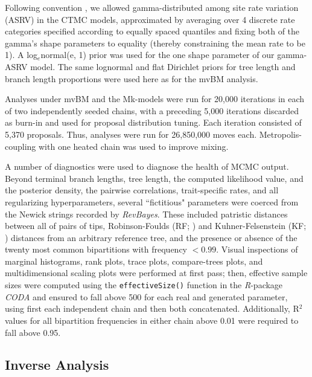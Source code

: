 \documentclass[10pt, twocolumn, twoside]{article}
\begin{document}
Following convention \citep{yangAmongsiteRateVariation1996}, we allowed gamma-distributed among site rate variation (ASRV) in the CTMC models, approximated by averaging over 4 discrete rate categories specified according to equally spaced quantiles and fixing both of the gamma's shape parameters to equality (thereby constraining the mean rate to be 1). A log$_{e}$normal(e, 1) prior was used for the one shape parameter of our gamma-ASRV model. The same lognormal and flat Dirichlet priors for tree length and branch length proportions were used here as for the mvBM analysis.

Analyses under mvBM and the Mk-models were run for 20,000 iterations in each of two independently seeded chains, with a preceding 5,000 iterations discarded as burn-in and used for proposal distribution tuning. Each iteration consisted of 5,370 proposals. Thus, analyses were run for 26,850,000 moves each. Metropolis-coupling \citep{geyerMarkovChainMonte1991, altekarParallelMetropolisCoupled2004} with one heated chain was used to improve mixing. 

A number of diagnostics were used to diagnose the health of MCMC output. Beyond terminal branch lengths, tree length, the computed likelihood value, and the posterior density, the pairwise correlations, trait-specific rates, and all regularizing hyperparameters, several ``fictitious" parameters were coerced from the Newick strings recorded by \textit{RevBayes}. These included patristic distances between all of pairs of tips, Robinson-Foulds (RF; \citeyear{robinsonComparisonPhylogeneticTrees1981}) and Kuhner-Felsenstein (KF; \citeyear{kuhnerSimulationComparisonPhylogeny1994}) distances from an arbitrary reference tree, and the presence or absence of the twenty most common bipartitions with frequency $< 0.99$. Visual inspections of marginal histograms, rank plots, trace plots, compare-trees plots, and multidimensional scaling plots were performed at first pass; then, effective sample sizes were computed using the \texttt{effectiveSize()} function in the \textit{R}-package \textit{CODA} \citep{plummerCODAConvergenceDiagnosis2006} and ensured to fall above 500 for each real and generated parameter, using first each independent chain and then both concatenated. Additionally, R$^2$ values for all bipartition frequencies in either chain above 0.01 were required to fall above 0.95. 

\subsection{Inverse Analysis}
\end{document}
